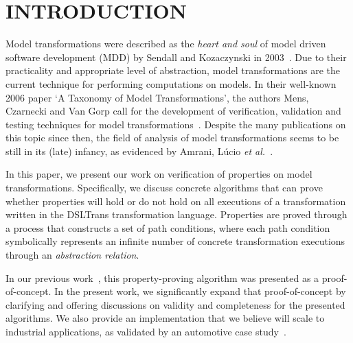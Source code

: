 \section{\uppercase{Introduction}}
\label{sec:intro}

Model transformations were described as the \emph{heart and soul} of model driven
software development (MDD) by Sendall and Kozaczynski in
2003~\cite{Sendall2003}.  Due to their practicality and appropriate level of
abstraction, model transformations are the current technique for performing
computations on models. In their well-known 2006 paper `A Taxonomy of Model
Transformations', the authors Mens, Czarnecki and Van Gorp call for the
development of verification, validation and testing techniques for model
transformations~\cite{Mens2006125}. Despite the many publications on this topic
since then, the field of analysis of model transformations seems to be still in
its (late) infancy, as evidenced by Amrani, L\'ucio \emph{et al.}~\cite{DBLP:conf/icst/AmraniLSCDVTC12}.


In this paper, we present our work on verification of properties on model
transformations. Specifically, we discuss concrete algorithms that can prove
whether properties will hold or do not hold on all executions of a
transformation written in the DSLTrans transformation language. Properties are
proved through a process that constructs a set of path conditions, where
each path condition symbolically represents an infinite number of concrete transformation
executions through an \emph{abstraction relation}.


In our previous work~\cite{Lucio:10}, this property-proving algorithm was
presented as a proof-of-concept. In the present work, we significantly expand
that proof-of-concept by clarifying and offering discussions on validity and
completeness for the presented algorithms. We also provide an implementation
that we believe will scale to industrial applications, as validated by an
automotive case study~\cite{gehan:13}.
 


